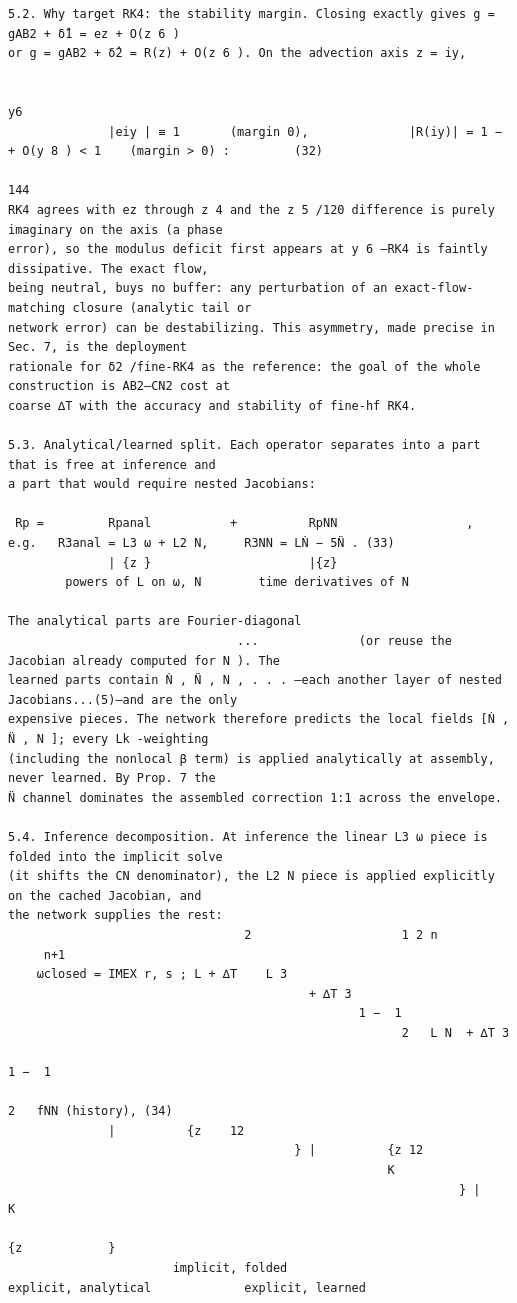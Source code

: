 \documentclass[letterpaper]{article}
\begin{document}
\begin{Verbatim}[fontsize=\fontsize{6.35}{7.15}\selectfont,breaklines=false]
5.2. Why target RK4: the stability margin. Closing exactly gives g = gAB2 + δ̂1 = ez + O(z 6 )
or g = gAB2 + δ̂2 = R(z) + O(z 6 ). On the advection axis z = iy,

                                                                                  y6
              |eiy | ≡ 1       (margin 0),              |R(iy)| = 1 −                + O(y 8 ) < 1    (margin > 0) :         (32)
                                                                                 144
RK4 agrees with ez through z 4 and the z 5 /120 difference is purely imaginary on the axis (a phase
error), so the modulus deficit first appears at y 6 —RK4 is faintly dissipative. The exact flow,
being neutral, buys no buffer: any perturbation of an exact-flow-matching closure (analytic tail or
network error) can be destabilizing. This asymmetry, made precise in Sec. 7, is the deployment
rationale for δ2 /fine-RK4 as the reference: the goal of the whole construction is AB2–CN2 cost at
coarse ∆T with the accuracy and stability of fine-hf RK4.

5.3. Analytical/learned split. Each operator separates into a part that is free at inference and
a part that would require nested Jacobians:

 Rp =         Rpanal           +          RpNN                  ,         e.g.   R3anal = L3 ω + L2 N,     R3NN = LṄ − 5N̈ . (33)
              | {z }                      |{z}
        powers of L on ω, N        time derivatives of N

The analytical parts are Fourier-diagonal
                                ...              (or reuse the Jacobian already computed for N ). The
learned parts contain Ṅ , N̈ , N , . . . —each another layer of nested Jacobians...(5)—and are the only
expensive pieces. The network therefore predicts the local fields [Ṅ , N̈ , N ]; every Lk -weighting
(including the nonlocal β term) is applied analytically at assembly, never learned. By Prop. 7 the
N̈ channel dominates the assembled correction 1:1 across the envelope.

5.4. Inference decomposition. At inference the linear L3 ω piece is folded into the implicit solve
(it shifts the CN denominator), the L2 N piece is applied explicitly on the cached Jacobian, and
the network supplies the rest:
                                 2                     1 2 n                
     n+1
    ωclosed = IMEX r, s ; L + ∆T    L 3
                                          + ∆T 3
                                                 1 −  1
                                                       2   L N  + ∆T 3
                                                                       1 −  1
                                                                             2   fNN (history), (34)
              |          {z    12
                                        } |          {z 12
                                                     K
                                                               } |         K
                                                                               {z            }
                       implicit, folded                             explicit, analytical             explicit, learned



\end{Verbatim}
\end{document}
